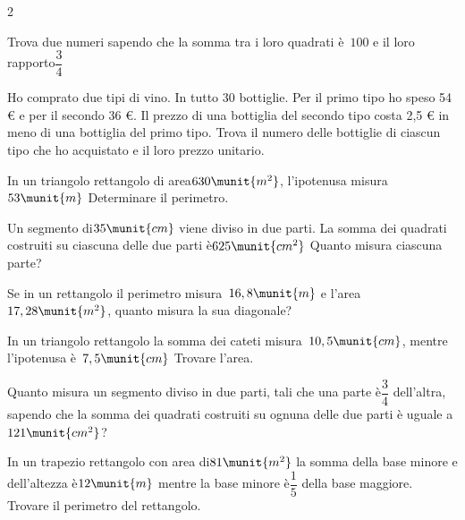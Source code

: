 \begin{htmulticols}{2}
\begin{esercizio}[*]
\label{ese:6.57}
Trova due numeri sapendo che la somma tra i loro quadrati è~\(100\) e il 
loro 
rapporto\( \dfrac 3 4\)
\end{esercizio}

\begin{esercizio}[*]
\label{ese:6.58}
Ho comprato due tipi di vino. In tutto 30 bottiglie. Per il primo tipo ho 
speso 
54 € e per il secondo 36 €. Il prezzo di una bottiglia del secondo tipo 
costa 
2,5 € in meno di una bottiglia del primo tipo. Trova il numero delle 
bottiglie 
di ciascun tipo che ho acquistato e il loro prezzo unitario.
\end{esercizio}

\begin{esercizio}[*]
\label{ese:6.59}
In un triangolo rettangolo di area\(630\munit{m^2}\), l'ipotenusa misura 
\(53\munit{m}~\)Determinare il perimetro.
\end{esercizio}

\begin{esercizio}[*]
\label{ese:6.60}
Un segmento di\(35\munit{cm}\) viene diviso in due parti. La somma dei 
quadrati 
costruiti su ciascuna delle due parti è\(625\munit{{cm}^2}\) Quanto misura 
ciascuna parte?
\end{esercizio}

\begin{esercizio}[*]
\label{ese:6.61}
Se in un rettangolo il perimetro misura~\(16,8\munit{m}\) e l'area\( 
17,28\munit{m^2}\), quanto misura la sua diagonale?
\end{esercizio}

\begin{esercizio}[*]
\label{ese:6.62}
In un triangolo rettangolo la somma dei cateti misura~\(10,5\munit{cm}\), 
mentre 
l'ipotenusa è~\(7,5\munit{cm}\) Trovare l'area.
\end{esercizio}

\begin{esercizio}[*]
\label{ese:6.63}
Quanto misura un segmento diviso in due parti, tali che una parte è\( 
\dfrac 3 4 
\) dell'altra, sapendo che la somma dei quadrati costruiti su ognuna 
delle 
due 
parti è uguale a\(121\munit{{cm}^2}\)?
\end{esercizio}

\begin{esercizio}[*]
\label{ese:6.64}
In un trapezio rettangolo con area di\(81\munit{m^2}\) la somma della base 
minore 
e dell'altezza è\(12\munit{m}\) mentre la base minore è\(\dfrac 1 5\) 
della 
base 
maggiore. Trovare il perimetro del rettangolo.
\end{esercizio}


\end{htmulticols}
